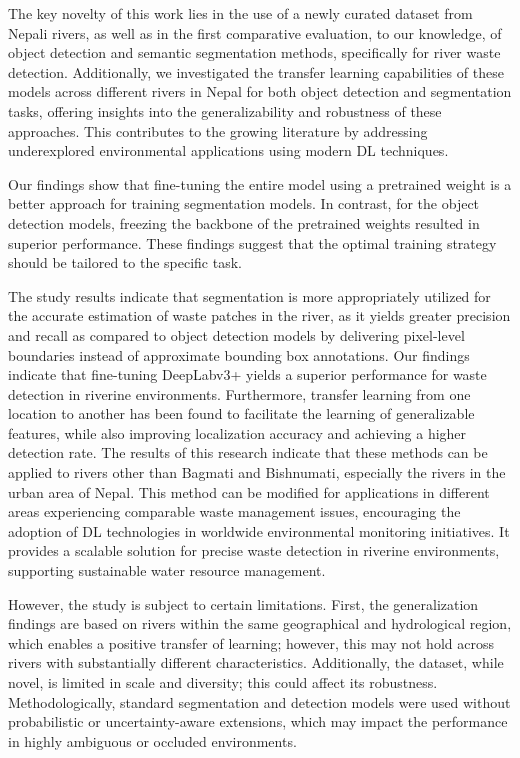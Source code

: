 \documentclass{ieeeaccess}
\begin{document}
The key novelty of this work lies in the use of a newly curated dataset from Nepali rivers, as well as in the first comparative evaluation, to our knowledge, of object detection and semantic segmentation methods, specifically for river waste detection. Additionally, we investigated the transfer learning capabilities of these models across different rivers in Nepal for both object detection and segmentation tasks, offering insights into the generalizability and robustness of these approaches. This contributes to the growing literature by addressing underexplored environmental applications using modern DL techniques.

Our findings show that fine-tuning the entire model using a pretrained weight is a better approach for training segmentation models. In contrast, for the object detection models, freezing the backbone of the pretrained weights resulted in superior performance. These findings suggest that the optimal training strategy should be tailored to the specific task. 

The study results indicate that segmentation is more appropriately utilized for the accurate estimation of waste patches in the river, as it yields greater precision and recall as compared to object detection models by delivering pixel-level boundaries instead of approximate bounding box annotations. Our findings indicate that fine-tuning DeepLabv3+ yields a superior performance for waste detection in riverine environments. Furthermore, transfer learning from one location to another has been found to facilitate the learning of generalizable features, while also improving localization accuracy and achieving a higher detection rate. The results of this research indicate that these methods can be applied to rivers other than Bagmati and Bishnumati, especially the rivers in the urban area of Nepal. This method can be modified for applications in different areas experiencing comparable waste management issues, encouraging the adoption of DL technologies in worldwide environmental monitoring initiatives. It provides a scalable solution for precise waste detection in riverine environments, supporting sustainable water resource management. 

However, the study is subject to certain limitations. First, the generalization findings are based on rivers within the same geographical and hydrological region, which enables a positive transfer of learning; however, this may not hold across rivers with substantially different characteristics. Additionally, the dataset, while novel, is limited in scale and diversity; this could affect its robustness. Methodologically, standard segmentation and detection models were used without probabilistic or uncertainty-aware extensions, which may impact the performance in highly ambiguous or occluded environments.
\end{document}
